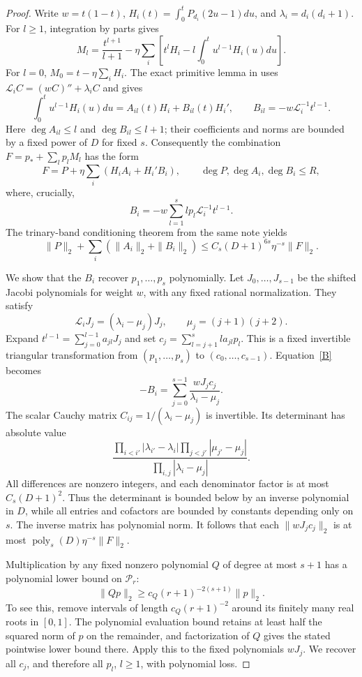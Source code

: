 \documentclass[11pt]{article}
\newcommand{\PP}{\mathcal P}
\begin{document}
\begin{proof}
Write $w=t(1-t)$, $H_i(t)=\int_0^tP_{d_i}(2u-1)du$, and
$\lambda_i=d_i(d_i+1)$. For $l\ge1$, integration by parts gives
\[
 M_l=\frac{t^{l+1}}{l+1}
 -\eta\sum_i\left[t^lH_i-l\int_0^t u^{l-1}H_i(u)du\right].
\]
For $l=0$, $M_0=t-\eta\sum_iH_i$.
The exact primitive lemma in 
uses $\mathcal L_iC=(wC)''+\lambda_iC$ and gives
\[
 \int_0^t u^{l-1}H_i(u)du=A_{il}(t)H_i+B_{il}(t)H_i',
 \qquad B_{il}=-w\mathcal L_i^{-1}t^{l-1}.
\]
Here $\deg A_{il}\le l$ and $\deg B_{il}\le l+1$; their coefficients
and norms are bounded by a fixed power of $D$ for fixed $s$.
Consequently the combination $F=p_*+\sum_lp_lM_l$ has the form
\[
 F=P+\eta\sum_i(H_i A_i+H_i'B_i),\qquad
 \deg P,\deg A_i,\deg B_i\le R,
\]
where, crucially,
\begin{equation}\label{B}
 B_i=-w\sum_{l=1}^s l p_l\mathcal L_i^{-1}t^{l-1}.
\end{equation}
The trinary-band conditioning theorem from the same note yields
\[
 \|P\|_2+\sum_i(\|A_i\|_2+\|B_i\|_2)
 \le C_s(D+1)^{6s}\eta^{-s}\|F\|_2.
\]

We show that the $B_i$ recover $p_1,\ldots,p_s$ polynomially.
Let $J_0,\ldots,J_{s-1}$ be the shifted Jacobi polynomials for weight
$w$, with any fixed rational normalization. They satisfy
\[
 \mathcal L_iJ_j=(\lambda_i-\mu_j)J_j,
 \qquad\mu_j=(j+1)(j+2).
\]
Expand $t^{l-1}=\sum_{j=0}^{l-1}a_{jl}J_j$ and set
$c_j=\sum_{l=j+1}^s l a_{jl}p_l$. This is a fixed invertible
triangular transformation from $(p_1,\ldots,p_s)$ to $(c_0,\ldots,c_{s-1})$.
Equation~\eqref{B} becomes
\[
 -B_i=\sum_{j=0}^{s-1}\frac{wJ_j c_j}{\lambda_i-\mu_j}.
\]
The scalar Cauchy matrix $C_{ij}=1/(\lambda_i-\mu_j)$ is invertible.
Its determinant has absolute value
\[
 \frac{\prod_{i<i'}|\lambda_{i'}-\lambda_i|
             \prod_{j<j'}|\mu_{j'}-\mu_j|}
      {\prod_{i,j}|\lambda_i-\mu_j|}.
\]
All differences are nonzero integers, and each denominator factor
is at most $C_s(D+1)^2$. Thus the determinant is bounded below by
an inverse polynomial in $D$, while all entries and cofactors are
bounded by constants depending only on $s$. The inverse matrix has
polynomial norm. It follows that each $\|wJ_j c_j\|_2$ is at most
$\operatorname{poly}_s(D)\eta^{-s}\|F\|_2$.

Multiplication by any fixed nonzero polynomial $Q$ of degree at most
$s+1$ has a polynomial lower bound on $\PP_r$:
\[
 \|Qp\|_2\ge c_Q(r+1)^{-2(s+1)}\|p\|_2.
\]
To see this, remove intervals of length $c_Q(r+1)^{-2}$ around its
finitely many real roots in $[0,1]$. The polynomial evaluation bound
retains at least half the squared norm of $p$ on the remainder, and
factorization of $Q$ gives the stated pointwise lower bound there.
Apply this to the fixed polynomials $wJ_j$. We recover all $c_j$,
and therefore all $p_l$, $l\ge1$, with polynomial loss.


\end{proof}
\end{document}
